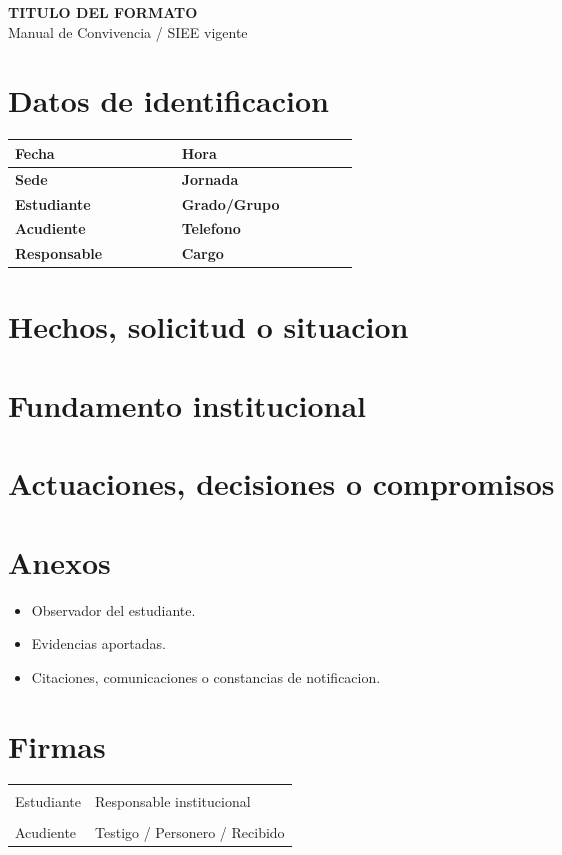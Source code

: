 \documentclass[letterpaper,11pt]{article}
\newcommand{\TituloFormato}{TITULO DEL FORMATO}
\newcommand{\FuenteFormato}{Manual de Convivencia / SIEE vigente}
\begin{document}
\begin{center}
{\Large\bfseries\color{SMJBlue}\TituloFormato}\\
{\small \FuenteFormato}
\end{center}

\section*{Datos de identificacion}
\begin{tabularx}{\linewidth}{|>{\bfseries}p{0.22\linewidth}|X|>{\bfseries}p{0.18\linewidth}|X|}
\hline
Fecha & & Hora & \\
\hline
Sede & & Jornada & \\
\hline
Estudiante & & Grado/Grupo & \\
\hline
Acudiente & & Telefono & \\
\hline
Responsable & & Cargo & \\
\hline
\end{tabularx}

\section*{Hechos, solicitud o situacion}
\vspace{2.5cm}

\section*{Fundamento institucional}
\vspace{1.5cm}

\section*{Actuaciones, decisiones o compromisos}
\vspace{3cm}

\section*{Anexos}
\begin{itemize}
  \item Observador del estudiante.
  \item Evidencias aportadas.
  \item Citaciones, comunicaciones o constancias de notificacion.
\end{itemize}

\section*{Firmas}
\vspace{1cm}
\begin{tabularx}{\linewidth}{X X}
\hrulefill & \hrulefill\\
Estudiante & Responsable institucional\\[2.2em]
\hrulefill & \hrulefill\\
Acudiente & Testigo / Personero / Recibido\\
\end{tabularx}
\end{document}
